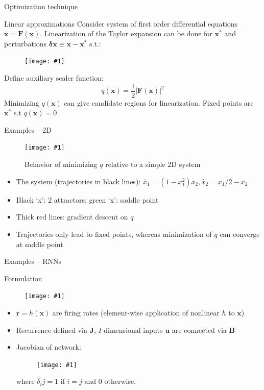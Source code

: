 \documentclass[9pt]{beamer}
\newcommand{\picEqHereWidth}[2] { %
    \begin{figure}[htp] 
        \centering
        \texttt{[image: \#1]}
    \end{figure}
}
\newcommand{\picHereWidth}[4] { %
    \begin{figure}[htp] %
        \centering
        \texttt{[image: \#1]} %
        \caption{#2} %
        \label{#3}
    \end{figure} %
}
\begin{document}
\begin{frame}{Optimization technique}
    \begin{alertblock}{Linear approximations}
        Consider system of first order differential equations $\mathbf{\dot{x} = F(x)}$. Linearization of the Taylor expansion can be done for $\mathbf{x^*}$ and perturbations $\mathbf{\delta x \equiv x - x^* }$ s.t.:
        \picEqHereWidth{../images/sussilo13-eq3_4.png}{0.3\linewidth}
        Define auxiliary scaler function:
        \[ q(\mathbf{x}) = \frac{1}{2} |\mathbf{F(x)}|^2 \]
        Minimizing $q(\mathbf{x})$ can give candidate regions for linearization. Fixed points are $\mathbf{x^*}$ s.t $q(\mathbf{x}) = 0$
    \end{alertblock}
\end{frame}

\begin{frame}{Examples -- 2D}
    \picHereWidth{../images/sussilo13-fig1_2d.png}{Behavior of minimizing $q$ relative to a simple 2D system}{fig:2d}{0.4\linewidth}
    \begin{itemize}
        \item The system (trajectories in black lines): $\dot{x_1} = (1 - x_1^2)x_2,\dot{x_2} = x_1/2 - x_2$
        \item Black `x': 2 attractors; green `x': saddle point
        \item Thick red lines: gradient descent on $q$
        \item Trajectories only lead to fixed points, whereas minimization of $q$ can converge at saddle point
    \end{itemize}
\end{frame}

\begin{frame}{Examples -- RNNs}
    \begin{alertblock}{Formulation}
        \picEqHereWidth{../images/sussilo13-eq10_11.png}{0.37\linewidth}
        \begin{itemize}
            \item $\mathbf{r} = h(\mathbf{x})$ are firing rates (element-wise application of nonlinear $h$ to $\mathbf{x}$)
            \item Recurrence defined via $\mathbf{J}$, $I$-dimensional inputs $\mathbf{u}$ are connected via $\mathbf{B}$
            \item Jacobian of network:
            \picEqHereWidth{../images/sussilo13-eq12.png}{0.25\linewidth}
            where $\delta_ij = 1$ if $i = j$ and $0$ otherwise.
        \end{itemize}
    \end{alertblock}
\end{frame}
\end{document}
